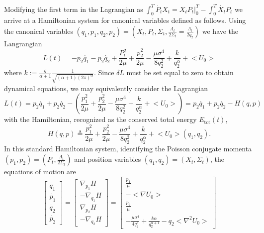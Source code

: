 \documentclass[letterpaper, 12pt]{article}
\begin{document}
\indent Modifying the first term in the Lagrangian as $\int_{0}^{T} \dot{P_t} X_t = {X_t} P_t\bigg|_{0}^{T} - \int_{0}^{T} \dot{X_t} P_t$ we arrive at a Hamiltonian system for canonical variables defined as follows. Using the canonical variables $(q_1, p_1, q_2, p_2) = (X_t, P_t, \Sigma_t, \frac{\Lambda_t}{2 \Sigma_t} = \frac{\Lambda_t}{2q_2})$ we have the Langrangian
\begin{equation}
L(t) = - p_2 \dot{q_1} - p_2 \dot{q_2} + \frac{P_t^2}{2 \mu} + \frac{p_2^2}{2 \mu} - \frac{\mu\sigma^4}{8 q_2^2} + \frac{k}{q_2^\alpha} + \big< U_0 \big>
\end{equation}
where $k := \frac{g}{\alpha + 1} \frac{1}{\sqrt{(\alpha+1) (2 \pi)^\alpha}}$. Since $\delta L$ must be set equal to zero to obtain dynamical equations, we may equivalently consider the Lagrangian
\begin{equation}
	L(t) = p_2 \dot{q_1} + p_2 \dot{q_2} - \left( \frac{p_1^2}{2 \mu} + \frac{p_2^2}{2 \mu} - \frac{\mu\sigma^4}{8 q_2^2} + \frac{k}{q_2^\alpha} + \big< U_0 \big> \right) = p_2 \dot{q_1} + p_2 \dot{q_2} - H(q,p)
\end{equation}
with the Hamiltonian, recognized as the conserved total energy $E_\text{tot}(t)$,
\begin{equation}
H(q,p) \triangleq \frac{p_1^2}{2 \mu} + \frac{p_2^2}{2 \mu} - \frac{\mu\sigma^4}{8 q_2^2} + \frac{k}{q_2^\alpha} + \big< U_0 \big>(q_1,q_2).
\end{equation}
In this standard  Hamiltonian system, identifying the Poisson conjugate momenta $(p_1,p_2) = (P_t,\frac{\Lambda_t}{2 \Sigma_t})$ and position variables $(q_1,q_2) = (X_t,\Sigma_t)$, the equations of motion are
\begin{equation}
\begin{bmatrix}
\dot{q_1} \\ \dot{p_1} \\ \dot{q_2} \\ \dot{p_2}
\end{bmatrix} = \begin{bmatrix}
\nabla_{p_1} H \\ -\nabla_{q_1} H \\ \nabla_{p_2} H \\ -\nabla_{q_2} H
\end{bmatrix} = 
\begin{bmatrix}
\frac{p_1}{\mu} \\  -\big< \nabla U_0 \big> \\ \frac{p_2}{\mu} \\ -\frac{\mu \sigma^4}{4 q_2^3} + \frac{k \alpha}{q_2^{\alpha + 1}} - q_2 \big< \nabla^2 U_0 \big> 
\end{bmatrix}
\end{equation}
\end{document}
